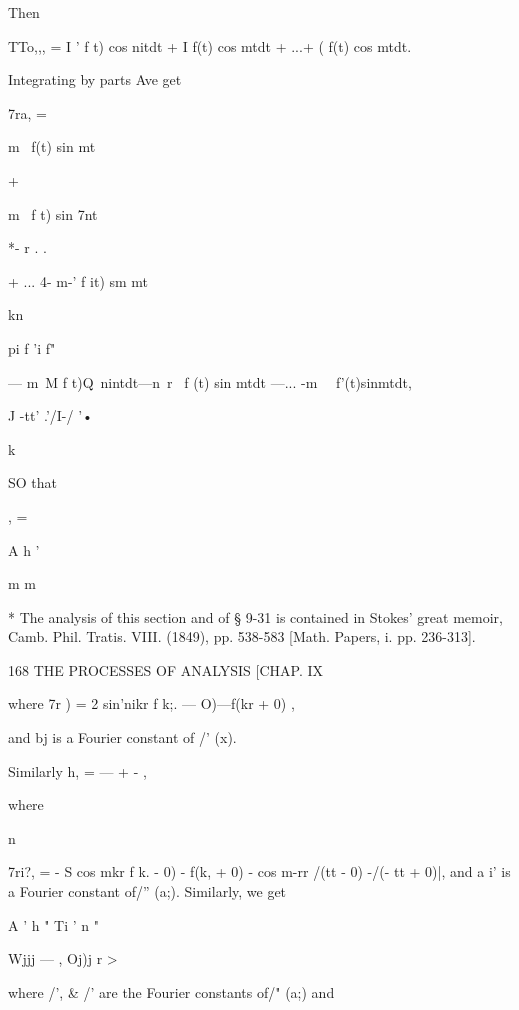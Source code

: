 Then 

TTo,,, = I ' f t) cos nitdt + I f(t) cos mtdt + ...+ ( f(t) cos mtdt. 

Integrating by parts Ave get 



7ra,  = 



m~ f(t) sin mt 



+ 



m~ f t) sin 7nt 



*-  r . .   

+ ... 4- m-' f it) sm mt 



kn 



pi f 'i f"  

— m~M f  t)Q\ nintdt—n\ r \ f (t) sin mtdt —... -m~  \ f'(t)sinmtdt, 

J -tt' .'/I-/ '• 



k  



SO that 



 ,  = 



A h ' 

m m 



* The analysis of this section and of § 9-31 is contained in Stokes' great memoir, Camb. Phil. 
Tratis. VIII. (1849), pp. 538-583 [Math. Papers, i. pp. 236-313]. 



168 THE PROCESSES OF ANALYSIS [CHAP. IX 

where 7r ) = 2 sin'nikr f k;. — O)—f(kr + 0) , 

and bj is a Fourier constant of /' (x). 

Similarly h,  = —  + -  , 

where 

n 

7ri?,  = - S cos mkr  f k.  - 0) - f(k, + 0)  - cos m-rr  /(tt - 0) -/(- tt + 0)|, 
and a i' is a Fourier constant of/'' (a;). 
Similarly, we get 

A ' h " Ti ' n " 

Wjjj — , Oj)j r > 

where   /', \& /' are the Fourier constants of/" (a;) and 


